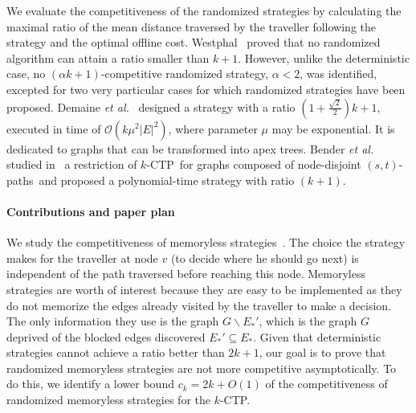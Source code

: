 \documentclass[preprint]{elsarticle}
\newcommand{\kctp}{$k$-CTP}
\newcommand{\card}[1]{\left| #1 \right|}
\newcommand{\stpaths}{$(s,t)$-paths}
\begin{document}
We evaluate the competitiveness of the randomized strategies by calculating the maximal ratio of the mean distance traversed by the traveller following the strategy and the optimal offline cost. Westphal~\cite{We08} proved that no randomized algorithm can attain a ratio smaller than $k+1$. However, unlike the deterministic case, no $\left(\alpha k+1\right)$-competitive randomized strategy, $\alpha < 2$, was identified, excepted for two very particular cases for which randomized strategies have been proposed. Demaine {\em et al.\/}~\cite{DeHuLiSa14} designed a strategy with a ratio $\left(1+\frac{\sqrt{2}}{2}\right)k+1$, executed in time of $\mathcal{O}\left(k\mu^2\card{E}^2\right)$, where parameter $\mu$ may be exponential. It is dedicated to graphs that can be transformed into apex trees. 
Bender {\em et al.\/} studied in~\cite{BeWe15} a restriction of \kctp ~for graphs composed of node-disjoint \stpaths ~and proposed a polynomial-time strategy with ratio $\left(k+1\right)$. 

\paragraph{Contributions and paper plan}
We study the competitiveness of memoryless strategies~\cite{Al03,BoEl98}. The choice the strategy makes for the traveller at node $v$ (to decide where he should go next) is independent of the path traversed before reaching this node. Memoryless strategies are worth of interest because they are easy to be implemented as they do not memorize the edges already visited by the traveller to make a decision. The only information they use is the graph $G\backslash E_*'$, which is the graph $G$ deprived of the blocked edges discovered $E_*' \subseteq E_*$.
Given that deterministic strategies cannot achieve a ratio better than $2k+1$, our goal is to prove that randomized memoryless strategies are not more competitive asymptotically. To do this, we identify a lower bound $c_k = 2k + O\left(1\right)$ of the competitiveness of randomized memoryless strategies for the \kctp.
\end{document}
